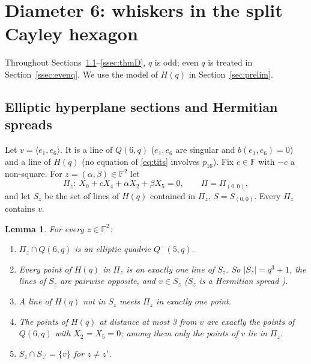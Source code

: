 \documentclass[11pt]{amsart}
\newtheorem{lemma}[theorem]{Lemma}
\theoremstyle{definition}
\theoremstyle{remark}
\numberwithin{equation}{section}
\newcommand{\F}{\mathbb F}
\begin{document}
\section{Diameter 6: whiskers in the split Cayley hexagon}\label{sec:d6}

Throughout Sections~\ref{ssec:d6coords}--\ref{ssec:thmD}, $q$ is odd; even $q$ is treated in
Section~\ref{ssec:evenq}. We use the model of $H(q)$ in Section~\ref{sec:prelim}.

\subsection{Elliptic hyperplane sections and Hermitian spreads}\label{ssec:d6coords}
Let $v=\langle e_1,e_6\rangle$. It is a line of $Q(6,q)$ ($e_1,e_6$ are singular and $b(e_1,e_6)=0$) and a line of $H(q)$
(no equation of \eqref{eq:tits} involves $p_{16}$). Fix $c\in\F$ with $-c$ a non-square. For $z=(\alpha,\beta)\in\F^2$ let
\[
\Pi_z:\ X_0+cX_4+\alpha X_2+\beta X_5=0,\qquad \Pi=\Pi_{(0,0)},
\]
and let $S_z$ be the set of lines of $H(q)$ contained in $\Pi_z$, $S=S_{(0,0)}$. Every $\Pi_z$ contains $v$.

\begin{lemma}\label{lem:Piz}
For every $z\in\F^2$:
\begin{enumerate}[label=(\alph*)]
\item $\Pi_z\cap Q(6,q)$ is an elliptic quadric $Q^-(5,q)$.
\item Every point of $H(q)$ in $\Pi_z$ is on exactly one line of $S_z$. So $|S_z|=q^3+1$, the lines of $S_z$ are pairwise
  opposite, and $v\in S_z$ ($S_z$ is a Hermitian spread \cite{T80}).
\item A line of $H(q)$ not in $S_z$ meets $\Pi_z$ in exactly one point.
\item The points of $H(q)$ at distance at most 3 from $v$ are exactly the points of $Q(6,q)$ with $X_2=X_5=0$; among them
  only the points of $v$ lie in $\Pi_z$.
\item $S_z\cap S_{z'}=\{v\}$ for $z\ne z'$.
\end{enumerate}
\end{lemma}
\end{document}
